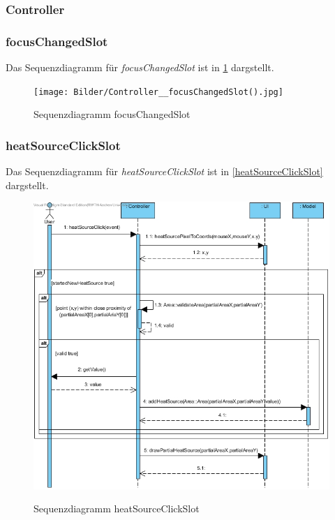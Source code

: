 \subsubsection{Controller}

\subsubsection*{focusChangedSlot}

Das Sequenzdiagramm für \emph{focusChangedSlot} ist in \ref{Sequenzdiagramm focusChangedSlot} dargstellt.

\begin{figure}[H]
	\centering
	\texttt{[image: Bilder/Controller\_\_focusChangedSlot().jpg]}\\
	\caption{Sequenzdiagramm focusChangedSlot}
	\label{Sequenzdiagramm focusChangedSlot}
\end{figure}

\subsubsection*{heatSourceClickSlot}

Das Sequenzdiagramm für \emph{heatSourceClickSlot} ist in \ref{heatSourceClickSlot} dargstellt.

\begin{figure}[H]
	\centering
	\includegraphics[scale=.6]{Bilder/Controller__heatSourceClickSlot().jpg}\\
	\caption{Sequenzdiagramm heatSourceClickSlot}
	\label{Sequenzdiagramm heatSourceClickSlot}
\end{figure}

